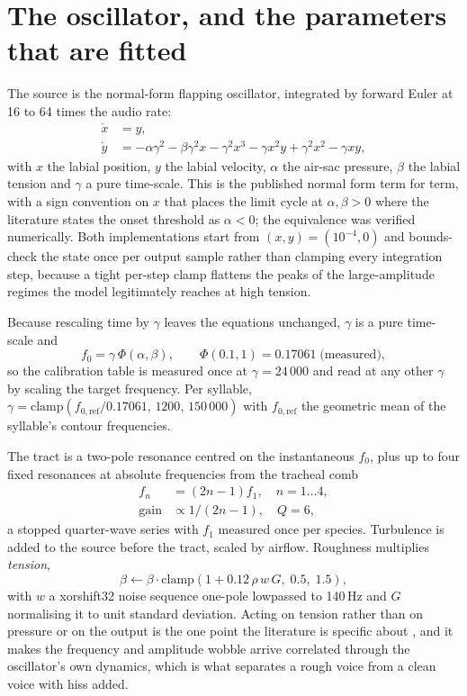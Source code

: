 \documentclass[10pt,twocolumn,a4paper]{article}
\begin{document}
\section{The oscillator, and the parameters that are fitted}
\label{app:model}

The source is the normal-form flapping oscillator, integrated by forward Euler at 16 to 64
times the audio rate:
\begin{align}
\dot{x} &= y, \\
\dot{y} &= -\alpha\gamma^{2} - \beta\gamma^{2}x - \gamma^{2}x^{3} - \gamma x^{2}y
           + \gamma^{2}x^{2} - \gamma xy ,
\end{align}
with $x$ the labial position, $y$ the labial velocity, $\alpha$ the air-sac pressure, $\beta$
the labial tension and $\gamma$ a pure time-scale. This is the published normal form term for
term, with a sign convention on $x$ that places the limit cycle at $\alpha, \beta > 0$ where
the literature states the onset threshold as $\alpha < 0$; the equivalence was verified
numerically. Both implementations start from $(x, y) = (10^{-4}, 0)$ and bounds-check the
state once per output sample rather than clamping every integration step, because a tight
per-step clamp flattens the peaks of the large-amplitude regimes the model legitimately
reaches at high tension.

Because rescaling time by $\gamma$ leaves the equations unchanged, $\gamma$ is a pure
time-scale and
\begin{equation}
f_0 = \gamma \, \Phi(\alpha, \beta), \qquad \Phi(0.1, 1) = 0.17061 \;\text{(measured)},
\end{equation}
so the calibration table is measured once at $\gamma = 24\,000$ and read at any other $\gamma$
by scaling the target frequency. Per syllable, $\gamma = \mathrm{clamp}(f_{0,\mathrm{ref}} /
0.17061,\, 1200,\, 150\,000)$ with $f_{0,\mathrm{ref}}$ the geometric mean of the syllable's
contour frequencies.

The tract is a two-pole resonance centred on the instantaneous $f_0$, plus up to four fixed
resonances at absolute frequencies from the tracheal comb
\begin{equation}
\begin{split}
f_n &= (2n-1) f_1, \quad n = 1 \ldots 4,\\
\text{gain} &\propto 1/(2n-1), \quad Q = 6,
\end{split}
\end{equation}
a stopped quarter-wave series with $f_1$ measured once per species. Turbulence is added to the
source before the tract, scaled by airflow. Roughness multiplies \emph{tension},
\begin{equation}
\beta \leftarrow \beta \cdot \mathrm{clamp}\!\left(1 + 0.12\,\rho\, w\, G,\; 0.5,\; 1.5\right),
\end{equation}
with $w$ a xorshift32 noise sequence one-pole lowpassed to 140\,Hz and $G$ normalising it to
unit standard deviation. Acting on tension rather than on pressure or on the output is the
one point the literature is specific about \citep{amador2021}, and it makes the frequency and
amplitude wobble arrive correlated through the oscillator's own dynamics, which is what
separates a rough voice from a clean voice with hiss added.
\end{document}
